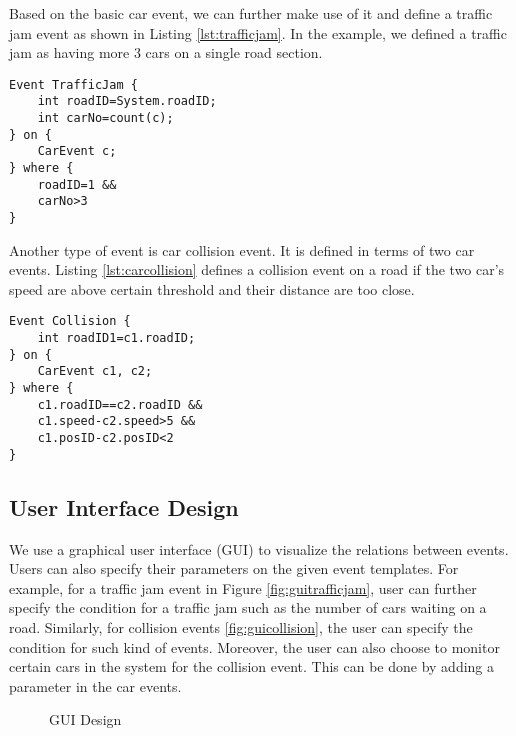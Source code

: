 Based on the basic car event, we can further make use of it and define a traffic jam event as shown in Listing \ref{lst:trafficjam}. In the example, we defined a traffic jam as having more 3 cars on a single road section.

\begin{lstlisting}[caption=Traffic jam event, label=lst:trafficjam]
Event TrafficJam {
	int roadID=System.roadID;
	int carNo=count(c);
} on {
	CarEvent c;
} where {
	roadID=1 &&
	carNo>3
}
\end{lstlisting}

Another type of event is car collision event. It is defined in terms of two car events. Listing \ref{lst:carcollision} defines a collision event on a road if the two car's speed are above certain threshold and their distance are too close.
\begin{lstlisting}[caption=Car collision event, label=lst:carcollision]
Event Collision {
	int roadID1=c1.roadID;
} on {
	CarEvent c1, c2;
} where {
	c1.roadID==c2.roadID &&
	c1.speed-c2.speed>5 && 
	c1.posID-c2.posID<2 
}
\end{lstlisting}

\subsection{User Interface Design}
We use a graphical user interface (GUI) to visualize the relations between events. Users can also specify their parameters on the given event templates. For example, for a traffic jam event in Figure \ref{fig:guitrafficjam}, user can further specify the condition for a traffic jam such as the number of cars waiting on a road. Similarly, for collision events \ref{fig:guicollision}, the user can specify the condition for such kind of events. Moreover, the user can also choose to monitor certain cars in the system for the collision event. This can be done by adding a parameter in the car events.

\begin{figure}
\centering
{}
\caption{GUI Design}
\label{fig:gui}
\end{figure}

